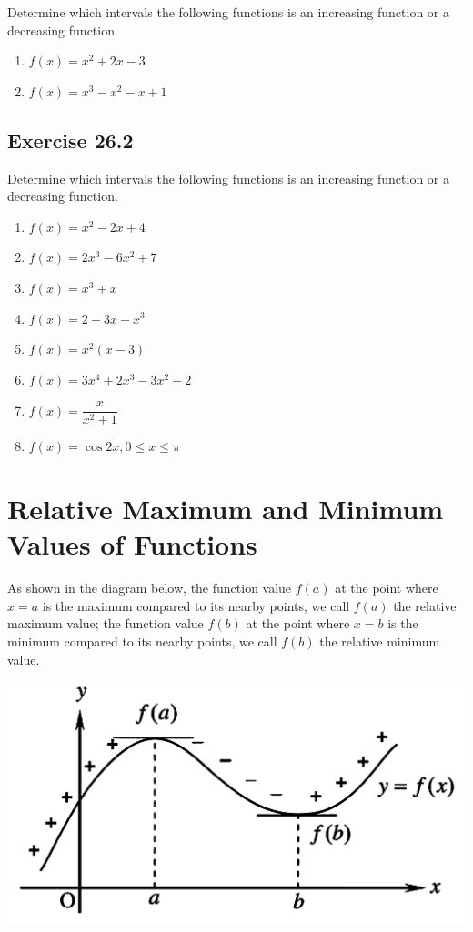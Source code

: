 \documentclass{report}
\begin{document}
Determine which intervals the following functions is an increasing function or
a decreasing function.
\begin{enumerate}
    \item $f(x)=x^2+2 x-3$
    \item $f(x)=x^3-x^2-x+1$
\end{enumerate}

\subsection{Exercise 26.2}

Determine which intervals the following functions is an increasing function or
a decreasing function.
\begin{enumerate}
    \item $f(x)=x^2-2 x+4$
    \item $f(x)=2 x^3-6 x^2+7$
    \item $f(x)=x^3+x$
    \item $f(x)=2+3 x-x^3$
    \item $f(x)=x^2(x-3)$
    \item $f(x)=3 x^4+2 x^3-3 x^2-2$
    \item $f(x)=\dfrac{x}{x^2+1}$
    \item $f(x)=\cos 2 x, 0 \leq x \leq \pi$
\end{enumerate}

\section{Relative Maximum and Minimum Values of Functions}

As shown in the diagram below, the function value $f(a)$ at the point where
$x=a$ is the maximum compared to its nearby points, we call $f(a)$ the relative
maximum value; the function value $f(b)$ at the point where $x=b$ is the
minimum compared to its nearby points, we call $f(b)$ the relative minimum
value.
\begin{center}
    \includegraphics[scale=0.25]{assets/26-6.png}
\end{center}
\end{document}
